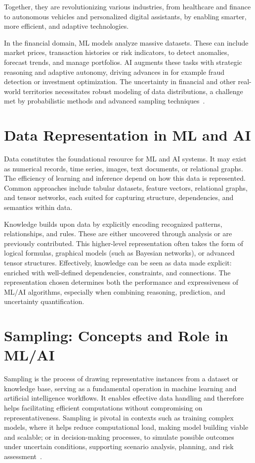 \documentclass[encoding=utf8,british]{tumphthesis}
\begin{document}
        Together, they are revolutionizing various industries, from healthcare and finance to autonomous vehicles and personalized digital assistants, 
        by enabling smarter, more efficient, and adaptive technologies.
        
        In the financial domain, ML models analyze massive datasets. These can include market prices, transaction histories or risk indicators, to detect anomalies, 
        forecast trends, and manage portfolios. AI augments these tasks with strategic reasoning and adaptive autonomy, driving advances in 
        for example fraud detection or investment optimization. The uncertainty in financial and other real-world territories 
        necessitates robust modeling of data distributions, a challenge met by probabilistic methods and advanced sampling techniques~\cite{FinanceMLAI}.

    \section*{Data Representation in ML and AI}
    \label{sect:Intro_Data_Rep}
        Data constitutes the foundational resource for ML and AI systems. It may exist as numerical records, time series, images, text documents, 
        or relational graphs. The efficiency of learning and inference depend on how this data is represented. Common approaches include tabular datasets, feature vectors, 
        relational graphs, and tensor networks, each suited for capturing structure, dependencies, and semantics within data.

        Knowledge builds upon data by explicitly encoding recognized patterns, relationships, and rules. These are either uncovered through analysis or are previously contributed. 
        This higher-level representation often takes the form of logical formulas, graphical models (such as Bayesian networks), or advanced tensor structures. Effectively, 
        knowledge can be seen as data made explicit: enriched with well-defined dependencies, constraints, and connections. The representation chosen determines both the 
        performance and expressiveness of ML/AI algorithms, especially when combining reasoning, prediction, and uncertainty quantification.

    \section*{Sampling: Concepts and Role in ML/AI}
    \label{sect:Intro_Sampling_Def}
        Sampling is the process of drawing representative instances from a dataset or knowledge base, serving as a fundamental operation in machine learning and artificial intelligence 
        workflows. It enables effective data handling and therefore helps facilitating efficient computations without 
        compromising on representativeness. Sampling is pivotal in contexts such as training complex models, where it helps reduce computational load, making model building viable and scalable; or
        in decision-making processes, to simulate possible outcomes under uncertain conditions, supporting scenario analysis, planning, and risk assessment~\cite{samplingAI}.
\end{document}
